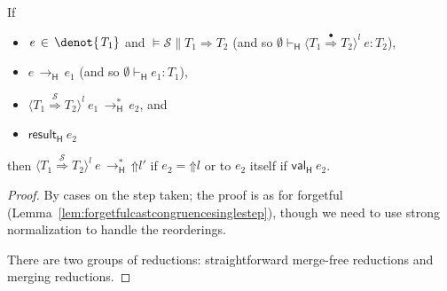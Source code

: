 \documentclass[9pt]{extarticle}
\newcommand{\ottnt}[1]{\mathit{#1}}
\newcommand{\ottsym}[1]{#1}
\begin{document}
{\begin{lemma}
  \label{lem:heedfulcastcongruencesinglestep}
  If
  \begin{itemize}
  \item $\ottnt{e} \, \in \,  \denot{ \ottnt{T_{{\mathrm{1}}}} } $ and $\models  \mathcal{S}  \mathrel{\parallel}  \ottnt{T_{{\mathrm{1}}}}  \Rightarrow  \ottnt{T_{{\mathrm{2}}}}$ (and so
    $ \emptyset   \vdash _{  \mathsf{H}  }   \langle  \ottnt{T_{{\mathrm{1}}}}  \mathord{ \overset{\bullet}{\Rightarrow} }  \ottnt{T_{{\mathrm{2}}}}  \rangle^{ \ottnt{l} } ~  \ottnt{e}   :  \ottnt{T_{{\mathrm{2}}}} $),
  \item $\ottnt{e} \,  \longrightarrow _{  \mathsf{H}  }  \, \ottnt{e_{{\mathrm{1}}}}$ (and so $ \emptyset   \vdash _{  \mathsf{H}  }  \ottnt{e_{{\mathrm{1}}}}  :  \ottnt{T_{{\mathrm{1}}}} $),
  \item $ \langle  \ottnt{T_{{\mathrm{1}}}}  \mathord{ \overset{ \mathcal{S} }{\Rightarrow} }  \ottnt{T_{{\mathrm{2}}}}  \rangle^{ \ottnt{l} } ~  \ottnt{e_{{\mathrm{1}}}}  \,  \longrightarrow ^{*}_{  \mathsf{H}  }  \, \ottnt{e_{{\mathrm{2}}}}$, and
  \item $ \mathsf{result} _{  \mathsf{H}  }~ \ottnt{e_{{\mathrm{2}}}} $
  \end{itemize}
then $ \langle  \ottnt{T_{{\mathrm{1}}}}  \mathord{ \overset{ \mathcal{S} }{\Rightarrow} }  \ottnt{T_{{\mathrm{2}}}}  \rangle^{ \ottnt{l} } ~  \ottnt{e}  \,  \longrightarrow ^{*}_{  \mathsf{H}  }  \,  \mathord{\Uparrow}  \ottnt{l'} $ if $\ottnt{e_{{\mathrm{2}}}}  \ottsym{=}   \mathord{\Uparrow}  \ottnt{l} $ or
  to $\ottnt{e_{{\mathrm{2}}}}$ itself if $ \mathsf{val} _{  \mathsf{H}  }~ \ottnt{e_{{\mathrm{2}}}} $.
\begin{proof}
    By cases on the step taken; the proof is as for forgetful \lambdah
    (Lemma~\ref{lem:forgetfulcastcongruencesinglestep}), though we
    need to use strong normalization to handle the reorderings.
{\iffull
    There are two groups of reductions: straightforward merge-free
    reductions and merging reductions.


}
\end{proof}
\end{lemma}}
\end{document}
